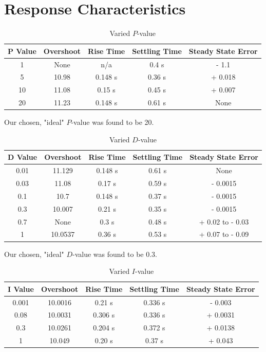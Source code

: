 \section{Response Characteristics}
\begin{table}[H]
	\centering
	\caption{Varied $P$-value}
\begin{tabular}{ | | c c c c c | | }
P Value & Overshoot & Rise Time & Settling Time & Steady State Error \\
\hline \hline
1       & None      & n/a       & 0.4 s         & - 1.1              \\
5       & 10.98     & 0.148 s   & 0.36 s        & + 0.018            \\
10      & 11.08     & 0.15 s    & 0.45 s        & + 0.007            \\
20      & 11.23     & 0.148 s   & 0.61 s        & None              
\end{tabular}
\end{table}

Our chosen, "ideal" $P$-value was found to be 20.%

\begin{table}[H]
	\centering
	\caption{Varied $D$-value}
\begin{tabular}{ | | c c c c c | | }
D Value & Overshoot & Rise Time & Settling Time & Steady State Error \\
\hline \hline
0.01    & 11.129    & 0.148 s   & 0.61 s        & None               \\
0.03    & 11.08     & 0.17 s    & 0.59 s        & - 0.0015           \\
0.1     & 10.7      & 0.148 s   & 0.37 s        & - 0.0015           \\
0.3     & 10.007    & 0.21 s    & 0.35 s        & - 0.0015           \\
0.7     & None      & 0.3 s     & 0.48 s        & + 0.02 to - 0.03   \\
1       & 10.0537   & 0.36 s    & 0.53 s        & + 0.07 to - 0.09  
\end{tabular}
\end{table}

Our chosen, "ideal" $D$-value was found to be 0.3.

\begin{table}[H]
	\centering
	\caption{Varied $I$-value}
\begin{tabular}{ | | c c c c c | | }
I Value & Overshoot & Rise Time & Settling Time & Steady State Error \\
\hline \hline
0.001   & 10.0016   & 0.21 s    & 0.336 s       & - 0.003            \\
0.08    & 10.0031   & 0.306 s   & 0.336 s       & + 0.0031           \\
0.3     & 10.0261   & 0.204 s   & 0.372 s       & + 0.0138           \\
1       & 10.049    & 0.20 s    & 0.37 s        & + 0.043           
\end{tabular}
\end{table}


